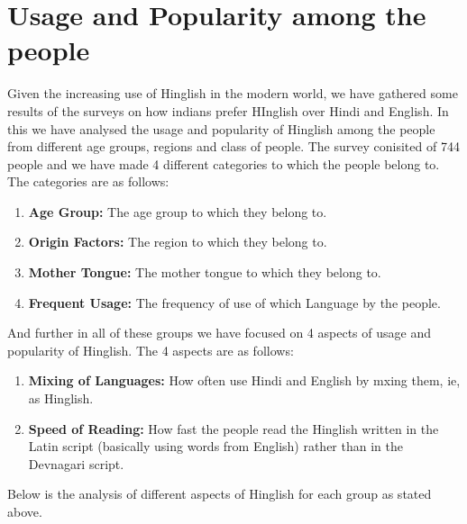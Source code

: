 \documentclass{article}
\begin{document}
\section{Usage and Popularity among the people}
Given the increasing use of Hinglish in the modern world, we have gathered some results of the surveys on how indians prefer HInglish over Hindi and English. In this we have analysed the usage and popularity of Hinglish among the people from different age groups, regions and class of people. The survey conisited of 744 people and we have made 4 different categories to which the people belong to. The categories are as follows:
\begin{enumerate}
    \item \textbf{Age Group:} The age group to which they belong to.
    \item \textbf{Origin Factors:} The region to which they belong to.
    \item \textbf{Mother Tongue:} The mother tongue to which they belong to.
    \item \textbf{Frequent Usage:} The frequency of use of which Language by the people.
\end{enumerate}
And further in all of these groups we have focused on 4 aspects of usage and popularity of Hinglish. The 4 aspects are as follows:

\begin{enumerate}
    \item \textbf{Mixing of Languages:} How often use Hindi and English by mxing them, ie, as Hinglish.
    \item \textbf{Speed of Reading:} How fast the people read the Hinglish written in the Latin script (basically using words from English) rather than in the Devnagari script.
\end{enumerate}
Below is the analysis of different aspects of Hinglish for each group as stated above.
\end{document}

